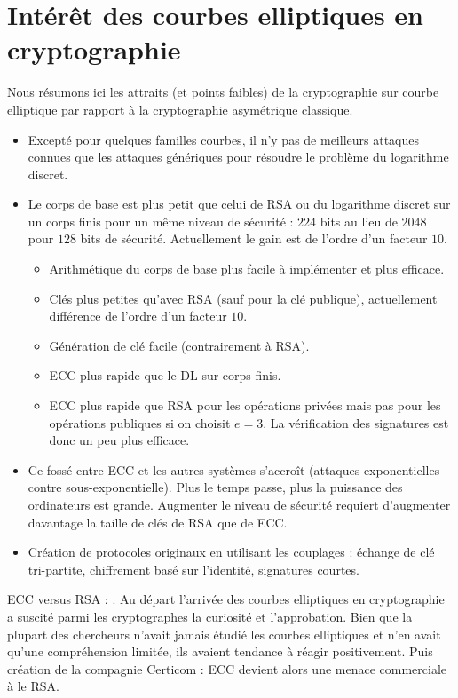 \section{Intérêt des courbes elliptiques en cryptographie}
Nous résumons ici les attraits (et points faibles) de la cryptographie sur courbe elliptique par rapport à la cryptographie asymétrique classique.
\begin{itemize}[label=$\bullet$]
    \item Excepté pour quelques familles courbes, il n'y pas de meilleurs attaques connues que les attaques génériques pour résoudre le problème du logarithme discret.
    \item Le corps de base est plus petit que celui de RSA ou du logarithme discret sur un corps finis pour un même niveau de sécurité : $224$ bits au lieu de $2048$ pour $128$ bits de sécurité. Actuellement le gain est de l'ordre d'un facteur $10$.
    \begin{itemize}[label=--]
        \item Arithmétique du corps de base plus facile à implémenter et plus efficace.
        \item Clés plus petites qu'avec RSA (sauf pour la clé publique), actuellement différence de l'ordre d'un facteur $10$.
        \item Génération de clé facile (contrairement à RSA).
        \item ECC plus rapide que le DL sur corps finis.
        \item ECC plus rapide que RSA pour les opérations privées mais pas pour les opérations publiques si on choisit $e = 3$. La vérification des signatures est donc un peu plus efficace.
    \end{itemize}
    \item Ce fossé entre ECC et les autres systèmes s'accroît (attaques exponentielles contre sous-exponentielle). Plus le temps passe, plus la puissance des ordinateurs est grande. Augmenter le niveau de sécurité requiert d'augmenter davantage la taille de clés de RSA que de ECC.
    \item Création de protocoles originaux en utilisant les couplages : échange de clé tri-partite, chiffrement basé sur l'identité, signatures courtes.
\end{itemize}

ECC versus RSA : \cite{koblitz2011elliptic}. Au départ l'arrivée des courbes elliptiques en cryptographie a suscité parmi les cryptographes la curiosité et l'approbation. Bien que la plupart des chercheurs n'avait jamais étudié les courbes elliptiques et n'en avait qu'une compréhension limitée, ils avaient tendance à réagir positivement. 
Puis création de la compagnie Certicom : ECC devient alors une menace commerciale à le RSA. 


